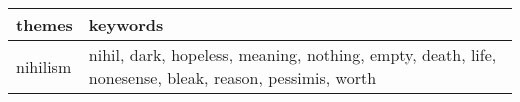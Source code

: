 \documentclass[../report.tex]{subfiles}
\begin{document}
\begin{table*}[ht]
        \centering
        \begin{tabular}{| l | l |}
        \toprule
                themes & keywords \\
        \midrule
   nihilism &  \multicolumn{1}{p{12cm}|}{nihil, dark, hopeless, meaning, nothing, empty, death, life, nonesense, bleak, reason, pessimis, worth} \\

\end{tabular}
\end{table*}
\end{document}
